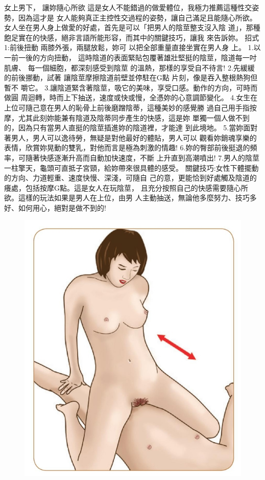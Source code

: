\documentclass[12pt,UTF8]{ctexbook}
\begin{document}
女上男下，
讓妳隨心所欲
這是女人不能錯過的做愛體位，我極力推薦這種性交姿勢，因為這才是
女人能夠真正主控性交過程的姿勢，讓自己滿足且能隨心所欲。
女人坐在男人身上做愛的好處，首先是可以「把男人的陰莖整支沒入陰
道」，那種飽足實在的快感，絕非言語所能形容，而其中的關鍵技巧，讓我
來告訴妳。
招式1:前後扭動
兩膝外張，兩腿放鬆，妳可
以把全部重量直接坐實在男人身
上。
1.以一前一後的方向扭動，
這時陰道的表面緊貼包覆著雄壯堅挺的陰莖，陰道每一吋肌膚、
每一個細胞，都深刻感受到陰莖
的溫熱，那樣的享受自不待言!
2.先緩緩的前後挪動，試著
讓陰莖摩擦陰道前壁並停駐在G點
片刻，像是吞入整根熱狗但暫不
嚼它。
3.讓陰道緊含著陰莖，吸它的美味，享受口感。動作的方向，可時而做圓
周迴轉，時而上下抽送，速度或快或慢，全憑妳的心意調節變化。
4.女生在上位可隨己意在男人的恥骨上前後磨蹭陰蒂，這種美妙的感覺勝
過自己用手指按摩，尤其此刻妳能兼有陰道及陰蒂同步產生的快感，這是妳
單獨一個人做不到的，因為只有當男人直挺的陰莖插進妳的陰道裡，才能達
到此境地。
5.當妳面對著男人，男人可以逸待勞，無疑是對他最好的體貼，男人可以
觀看妳銷魂享樂的表情，欣賞妳晃動的雙乳，對他而言是極為刺激的情趣!
6.妳的臀部前後挺退的頻率，可隨著快感逐漸升高而自動加快速度，不斷
上升直到高潮噴出!
7.男人的陰莖一柱擎天，龜頭可直抵子宮頸，給妳帶來很具體的感受。
關鍵技巧:女性下體擺動的方向、力道輕重、速度快慢、深淺，可隨自
己的意，更能恰到好處觸及陰道的癢處，包括按摩G點。這是女人在玩陰莖，
且充分按照自己的快感需要隨心所欲。這樣的玩法如果是男人在上位，由男
人主動抽送，無論他多麼努力、技巧多好、如何用心，絕對是做不到的!

\begin{figure}[htbp]
	\centering
	\includegraphics[width=0.7\linewidth]{24}
	\caption{}
	\label{fig:1}
\end{figure}
\end{document}
